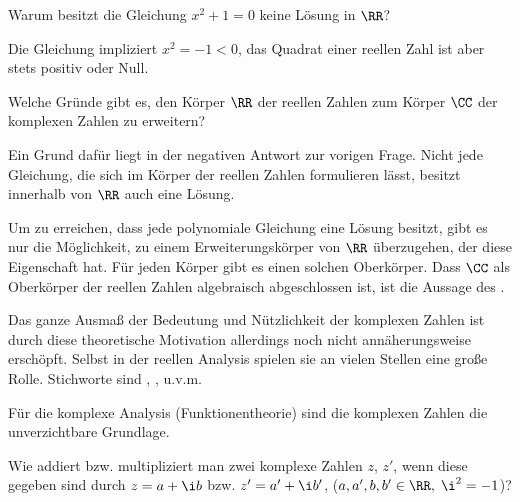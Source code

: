 



\begin{frage}
  Warum besitzt die Gleichung $x^2+1=0$ keine Lösung in $\RR$?
\end{frage}

\begin{antwort}
  Die Gleichung impliziert $x^2 =-1 <0$, das Quadrat einer reellen Zahl 
  ist aber stets positiv oder Null.  
  \AntEnd
\end{antwort}






\begin{frage}
  Welche Gründe gibt es, den Körper $\RR$ der reellen Zahlen zum  
  Körper $\CC$ der komplexen Zahlen zu erweitern?
\end{frage}

\begin{antwort}
  Ein Grund dafür liegt in der negativen Antwort zur vorigen Frage. 
  Nicht jede Gleichung, die sich im Körper der reellen Zahlen 
  formulieren lässt, besitzt innerhalb von $\RR$ auch eine 
  Lösung. 

  Um zu erreichen, dass jede polynomiale Gleichung eine Lösung besitzt, 
  gibt es nur die Möglichkeit, zu einem Erweiterungskörper von $\RR$ 
  überzugehen, der diese Eigenschaft hat. 
  Für jeden Körper gibt es einen solchen  
   Oberkörper. 
  Dass $\CC$ als Oberkörper der reellen Zahlen algebraisch abgeschlossen 
  ist, ist die Aussage des .

  Das ganze Ausmaß der Bedeutung und Nützlichkeit der komplexen Zahlen 
  ist durch diese theoretische Motivation allerdings noch nicht annäherungsweise 
  erschöpft. Selbst in der reellen Analysis spielen sie an vielen Stellen  
  eine große Rolle. Stichworte sind , 
  , 
   u.v.m. 

  Für die komplexe Analysis (Funktionentheorie) sind die komplexen Zahlen 
  die unverzichtbare Grundlage.
  \AntEnd
\end{antwort}


\begin{frage}
  Wie addiert bzw. multipliziert man zwei komplexe Zahlen $z$, 
  $z'$, wenn diese gegeben sind durch 
  $z=a+\i b$ bzw. $z'=a'+\i b'$, ($a,a',b,b' \in \RR,\; \i ^2=-1$)?
\end{frage}



